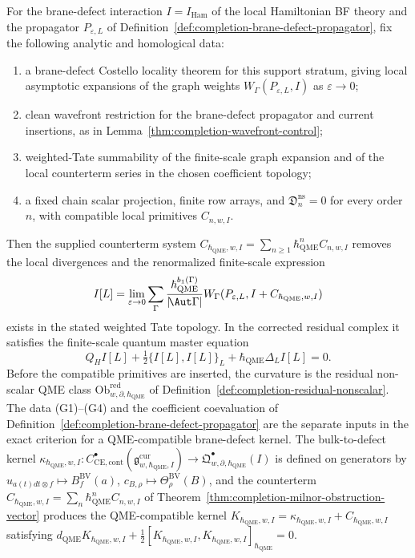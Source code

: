 \begin{thm}
\label{thm:completion-graph-qme}
For the brane-defect interaction
\(I=I_{\mathrm{Ham}}\) of the local Hamiltonian BF theory and the
propagator \(P_{\varepsilon,L}\) of
Definition~\ref{def:completion-brane-defect-propagator}, fix the
following analytic and homological data:
\begin{enumerate}[label=\textup{(G\arabic*)}]
\item a brane-defect Costello locality theorem for this support stratum,
  giving local asymptotic expansions of the graph weights
  \(W_\Gamma(P_{\varepsilon,L},I)\) as \(\varepsilon\to0\);
\item clean wavefront restriction for the brane-defect propagator and
  current insertions, as in
  Lemma~\ref{thm:completion-wavefront-control};
\item weighted-Tate summability of the finite-scale graph expansion and
  of the local counterterm series in the chosen coefficient topology;
\item a fixed chain scalar projection, finite row arrays, and
  \(\mathfrak D^{\mathrm{ns}}_n=0\) for every order \(n\), with
  compatible local primitives \(C_{n,w,I}\).
\end{enumerate}
Then the supplied counterterm system
\(C_{\hbar_{\mathrm{QME}},w,I}=\sum_{n\ge1}\hbar_{\mathrm{QME}}^nC_{n,w,I}\) removes the local
divergences and the renormalized finite-scale expression
\[
  I[L]=\lim_{\varepsilon\to0}\sum_{\Gamma}
  \frac{\hbar_{\mathrm{QME}}^{b_1(\Gamma)}}{|\!\Aut\Gamma|}
  W_\Gamma(P_{\varepsilon,L},I+C_{\hbar_{\mathrm{QME}},w,I})
\]
exists in the stated weighted Tate topology.  In the corrected residual
complex it satisfies the finite-scale quantum master equation
\[
  Q_HI[L]+\tfrac12\{I[L],I[L]\}_L+\hbar_{\mathrm{QME}}\Delta_LI[L]=0 .
\]
Before the compatible primitives are inserted, the curvature is the
residual non-scalar QME class
\(\mathrm{Ob}^{\mathrm{red}}_{w,\partial,\hbar_{\mathrm{QME}}}\) of
Definition~\ref{def:completion-residual-nonscalar}.  The data
\textup{(G1)--(G4)} and the coefficient coevaluation of
Definition~\ref{def:completion-brane-defect-propagator} are the
separate inputs in the exact criterion for a QME-compatible
brane-defect kernel.  The bulk-to-defect
kernel
\(\kappa_{\hbar_{\mathrm{QME}},w,I}:C^\bullet_{\mathrm{CE,cont}}(\mathfrak g^{\mathrm{cur}}_{w,\hbar_{\mathrm{QME}},I})
\to\mathfrak Q^\bullet_{w,\partial,\hbar_{\mathrm{QME}}}(I)\) is defined on
generators by \(u_{a(t)dt\otimes f}\mapsto B^{\mathrm{BV}}_f(a)\),
\(c_{B,\rho}\mapsto\Theta^{\mathrm{BV}}_\rho(B)\), and the
counterterm \(C_{\hbar_{\mathrm{QME}},w,I}=\sum_n\hbar_{\mathrm{QME}}^n C_{n,w,I}\) of
Theorem~\ref{thm:completion-milnor-obstruction-vector} produces the
QME-compatible kernel
\(K_{\hbar_{\mathrm{QME}},w,I}=
\kappa_{\hbar_{\mathrm{QME}},w,I}+C_{\hbar_{\mathrm{QME}},w,I}\) satisfying
\(d_{\mathrm{QME}}K_{\hbar_{\mathrm{QME}},w,I}
+\tfrac12[K_{\hbar_{\mathrm{QME}},w,I},
K_{\hbar_{\mathrm{QME}},w,I}]_{\hbar_{\mathrm{QME}}}=0\).
\end{thm}

